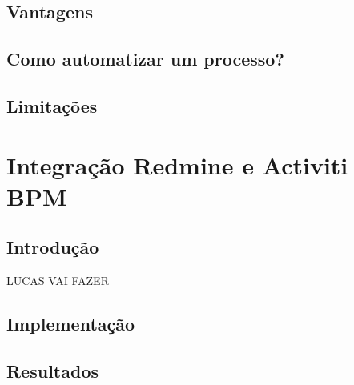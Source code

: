 \section{Vantagens}\label{sec:LABEL_CHP_4_SEC_B}

\section{Como automatizar um processo?}\label{sec:LABEL_CHP_4_SEC_C}

\section{Limitações}\label{sec:LABEL_CHP_4_SEC_D}


\chapter{Integração Redmine e Activiti BPM}\label{chp:LABEL_CHP_5}

\section{Introdução}\label{sec:LABEL_CHP_5_SEC_A}
LUCAS VAI FAZER

\section{Implementação}\label{sec:LABEL_CHP_5_SEC_A}

\section{Resultados}\label{sec:LABEL_CHP_5_SEC_A}